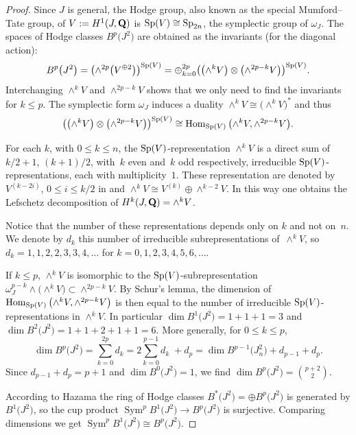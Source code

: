 \documentclass[10pt,a4paper]{amsart}
\numberwithin{equation}{section}
\begin{document}
\begin{proof}Since $J$ is general, the Hodge group, also known as the special Mumford--Tate group,
of $V:=H^1(J,{\bf Q})$ is ${\rm Sp}(V)\cong {\rm Sp}_{2n}$, the symplectic group of $\omega_J$.
The spaces of Hodge classes $B^p\big(J^2\big)$ are obtained as the invariants (for the diagonal action):
\[
B^p\big(J^2\big) = \big({\wedge}^{2p}\big(V^{\oplus 2}\big)\big)^{{\rm Sp}(V)} =
\oplus_{k=0}^{2p} \big(\big({\wedge}^kV\big)\otimes\big({\wedge}^{2p-k}V\big)\big)^{{\rm Sp}(V)}.
\]
Interchanging $\wedge^kV$ and $\wedge^{2p-k}V$ shows that we only need to find the
invariants for $k\leq p$.
The symplectic form $\omega_J$ induces a duality $\wedge^kV\cong\big({\wedge}^kV\big)^*$ and thus
\[
\big(\big({\wedge}^kV\big)\otimes\big({\wedge}^{2p-k}V\big)\big)^{{\rm Sp}(V)} \cong
\operatorname{Hom}_{{\rm Sp}(V)}\big({\wedge}^kV,\wedge^{2p-k}V\big).
\]

For each $k$, with $0\leq k\leq n$,
the ${\rm Sp}(V)$-representation $\wedge^kV$ is a direct sum of $k/2+1$, $(k+1)/2$,
with~$k$ even and~$k$ odd respectively, irreducible ${\rm Sp}(V)$-representations,
each with multiplicity~$1$.
These representation are denoted by $V^{(k-2i)}$, $0\leq i\leq k/2$ in \cite[Theorem~17.5]{FH} and
$\wedge^kV\cong V^{(k)}\oplus\wedge^{k-2}V$.
In this way one obtains the Lefschetz decomposition \cite[p.~122]{GH} of $H^k(J,{\bf Q})=\wedge^kV$.

Notice that the number of these representations depends only on $k$ and not on~$n$.
We denote by $d_k$ this number of irreducible subrepresentations of~$\wedge^kV$,
so $d_k=1,1,2,2,3,3,4,\dots$ for $k=0,1,2,3,4,5,6,\dots$.

If $k\leq p$, $\wedge^kV$ is isomorphic to the ${\rm Sp}(V)$-subrepresentation
$\omega_J^{p-k}\wedge \big({\wedge}^kV\big)\subset \wedge^{2p-k}V$.
By Schur's lemma, the dimension of $\operatorname{Hom}_{{\rm Sp}(V)}\big({\wedge}^kV,\wedge^{2p-k}V\big)$ is then equal to
the number of irreducible ${\rm Sp}(V)$-representations in $\wedge^kV$.
In particular $\dim B^1\big(J^2\big)=1+1+1=3$ and $\dim B^2\big(J^2\big)=1+1+2+1+1=6$.
More generally, for $0\leq k\leq p$,
\[
\dim B^p\big(J^2\big) = \sum_{k=0}^{2p} d_k =
2\sum_{k=0}^{p-1}d_k\;+ d_{p} = \dim B^{p-1}\big(J_{n}^2\big) + d_{p-1} + d_p.
\]
Since $d_{p-1}+d_p=p+1$ and $\dim B^0\big(J^2\big)=1$, we find $\dim B^p\big(J^2\big)=\binom{p+2}{2}$.

According to Hazama \cite[Proposition 1.6]{Haz}
the ring of Hodge classes $B^*\big(J^2\big)=\oplus B^p\big(J^2\big)$ is generated by $B^1\big(J^2\big)$,
so the cup product $\operatorname{Sym}^pB^1\big(J^2\big)\rightarrow B^p\big(J^2\big)$ is surjective. Comparing dimensions we
get $\operatorname{Sym}^pB^1\big(J^2\big)\cong B^p\big(J^2\big)$.


\end{proof}
\end{document}
